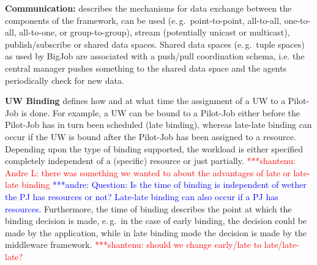 \documentclass[conference,final]{IEEEtran}
\newcommand{\jhanote}[1]{ {\textcolor{red} { ***shantenu: #1 }}}
\newcommand{\alnote}[1]{ {\textcolor{blue} { ***andre: #1 }}}
\newcommand{\alnote}[1]{}
\newcommand{\jhanote}[1]{}
\begin{document}
\textbf{Communication:} describes the mechanisms for data exchange
between the components of the framework, can be used (e.\,g.\
point-to-point, all-to-all, one-to-all, all-to-one, or
group-to-group), stream (potentially unicast or multicast),
publish/subscribe or shared data spaces. Shared data spaces (e.\,g.\
tuple spaces) as used by BigJob are associated with a push/pull
coordination schema, i.e. the central manager pushes something to the
shared data space and the agents periodically check for new data.
		

\textbf{UW Binding} defines how and at what time the assignment of a
UW to a Pilot-Job is done.  For example, a UW can be bound to a
Pilot-Job either before the Pilot-Job has in turn been scheduled (late
binding), whereas late-late binding can occur if the UW is bound after
the Pilot-Job has been assigned to a resource.  Depending upon the
type of binding supported, the workload is either specified completely
independent of a (specific) resource or just partially.
\jhanote{Andre L: there was something we wanted to about the advantages of late
or late-late binding} \alnote{Question: Is the time of binding is independent of
wether the PJ has resources or not? Late-late binding can also occur if a PJ has
resources.}
Furthermore, the time of binding describes the point at which the
binding decision is made, e.\,g.\ in the case of early binding, the
decision could be made by the application, while in late binding mode
the decision is made by the middleware framework. \jhanote{should we
  change early/late to late/late-late?}

\end{document}
